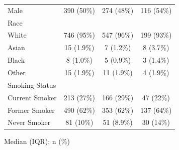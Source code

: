 \documentclass{article}
\begin{document}
\begin{table}[hbpt]
\begin{threeparttable}
{\begin{tabular}{lccc}
        \qquad    Male & 390 (50\%) & 274 (48\%) & 116 (54\%) \\ 
        Race &  &  &  \\ 
        \qquad  White & 746 (95\%) & 547 (96\%) & 199 (93\%) \\ 
        \qquad  Asian & 15 (1.9\%) & 7 (1.2\%) & 8 (3.7\%) \\ 
        \qquad  Black & 8 (1.0\%) & 5 (0.9\%) & 3 (1.4\%) \\ 
        \qquad  Other & 15 (1.9\%) & 11 (1.9\%) & 4 (1.9\%) \\ 
        Smoking Status &  &  &  \\ 
        \qquad   Current Smoker & 213 (27\%) & 166 (29\%) & 47 (22\%) \\ 
        \qquad   Former Smoker & 490 (62\%) & 353 (62\%) & 137 (64\%) \\ 
        \qquad    Never Smoker & 81 (10\%) & 51 (8.9\%) & 30 (14\%) \\ 
              \hline
    \end{tabular}}
    \begin{tablenotes}\footnotesize
    \item[\textsuperscript{1}]Median (IQR); n (\%)
    \end{tablenotes}
    \end{threeparttable}
\end{table}
\end{document}
